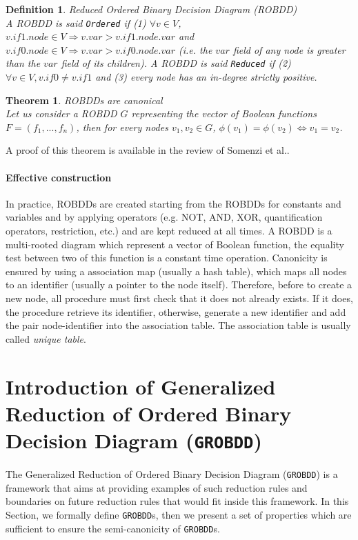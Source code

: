 \documentclass[a4paper,10pt]{article}
\newcommand{\GroBdd}{\texttt{GROBDD}}
\newtheorem{newtheo}{Theorem}
\newcommand{\theorem}[2]{\begin{newtheo}{\textsf{#1}\\} #2 \end{newtheo}}
\newtheorem{newdef}{Definition}
\newcommand{\definition}[2]{\begin{newdef}{#1\\}#2\end{newdef}}
\begin{document}
\definition{Reduced Ordered Binary Decision Diagram (ROBDD)}
{
A ROBDD is said \texttt{Ordered} if (1) $\forall v\in V$, $v.\mathit{if1}.\mathit{node} \in V \Rightarrow v.\mathit{var} > v.\mathit{if1}.\mathit{node}.\mathit{var}$ and $v.\mathit{if0}.\mathit{node} \in V \Rightarrow v.\mathit{var} > v.\mathit{if0}.\mathit{node}.\mathit{var}$ (i.e. the $\mathit{var}$ field of any node is greater than the $\mathit{var}$ field of its children).
A ROBDD is said \texttt{Reduced} if (2) $\forall v\in V, v.if0 \neq v.if1$ and (3) every node has an in-degree strictly positive.
}

\theorem{ROBDDs are canonical}
{
Let us consider a ROBDD $G$ representing the vector of Boolean functions $F=(f_1, ..., f_n)$, then for every nodes $v_1, v_2 \in G$, $\phi(v_1) = \phi(v_2) \Leftrightarrow v_1 = v_2$.
}
A proof of this theorem is available in the review of Somenzi et al.\cite{Somenzi1999}.

\paragraph{Effective construction\\}
In practice, ROBDDs are created starting from the ROBDDs for constants and variables and by applying operators (e.g. NOT, AND, XOR, quantification operators, restriction, etc.) and are kept reduced at all times.
A ROBDD is a multi-rooted diagram which represent a vector of Boolean function, the equality test between two of this function is a constant time operation.
Canonicity is ensured by using a association map (usually a hash table), which maps all nodes to an identifier (usually a pointer to the node itself).
Therefore, before to create a new node, all procedure must first check that it does not already exists. If it does, the procedure retrieve its identifier, otherwise, generate a new identifier and add the pair node-identifier into the association table.
The association table is usually called \textit{unique table}.

\section{Introduction of Generalized Reduction of Ordered Binary Decision Diagram (\GroBdd{})}

The Generalized Reduction of Ordered Binary Decision Diagram (\GroBdd{}) is a framework that aims at providing examples of such reduction rules and boundaries on future reduction rules that would fit inside this framework.
In this Section, we formally define \GroBdd{}s, then we present a set of properties which are sufficient to ensure the semi-canonicity of \GroBdd{}s.
\end{document}
